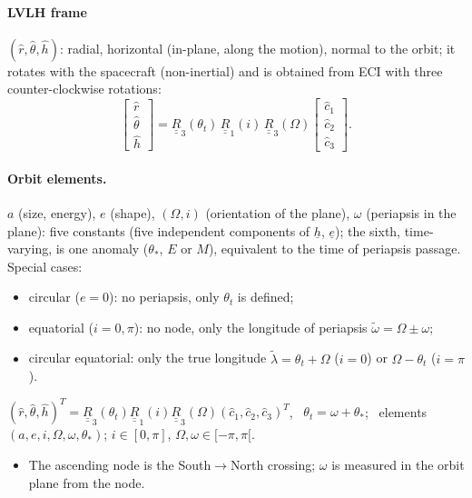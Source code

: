 \paragraph{LVLH frame} $(\hat r,\hat\theta,\hat h)$: radial, horizontal (in-plane, along the motion), normal to the orbit; it rotates with the spacecraft
(non-inertial) and is obtained from ECI with three counter-clockwise rotations:
\begin{equation}
\begin{bmatrix}\hat r\\ \hat\theta\\ \hat h\end{bmatrix}=\underline{\underline R}_3(\theta_t)\,\underline{\underline R}_1(i)\,\underline{\underline R}_3(\Omega)\begin{bmatrix}\hat c_1\\ \hat c_2\\ \hat c_3\end{bmatrix}.
\end{equation}

\paragraph{Orbit elements.} $a$ (size, energy), $e$ (shape), $(\Omega,i)$ (orientation of the plane), $\omega$ (periapsis in the plane): five constants
(five independent components of $\underline h$, $\underline e$); the sixth, time-varying, is one anomaly ($\theta_*$, $E$ or $M$), equivalent to the time of
periapsis passage. Special cases:
\begin{itemize}
\item circular ($e=0$): no periapsis, only $\theta_t$ is defined;
\item equatorial ($i=0,\pi$): no node, only the longitude of periapsis $\tilde\omega=\Omega\pm\omega$;
\item circular equatorial: only the true longitude $\tilde\lambda=\theta_t+\Omega$ ($i=0$) or $\Omega-\theta_t$ ($i=\pi$).
\end{itemize}
\begin{keyf}
$(\hat r,\hat\theta,\hat h)^T=\underline{\underline R}_3(\theta_t)\underline{\underline R}_1(i)\underline{\underline R}_3(\Omega)(\hat c_1,\hat c_2,\hat c_3)^T$, \ $\theta_t=\omega+\theta_*$; \
elements $(a,e,i,\Omega,\omega,\theta_*)$; $i\in[0,\pi]$, $\Omega,\omega\in[-\pi,\pi[$.
\end{keyf}
\pitfalls
\begin{itemize}
\item The ascending node is the South$\to$North crossing; $\omega$ is measured in the orbit plane from the node.
\end{itemize}

